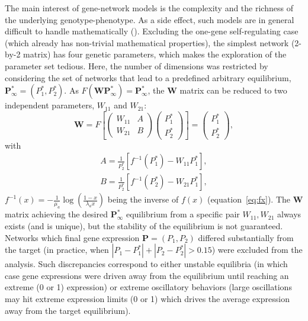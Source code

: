 \documentclass[10pt,a4paper]{article}
\begin{document}
The main interest of gene-network models is the complexity and the richness of the underlying genotype-phenotype. As a side effect, such models are in general difficult to handle mathematically (\cite{CTH11,LP12}). Excluding the one-gene self-regulating case (which already has non-trivial mathematical properties), the simplest network (2-by-2 matrix) has four genetic parameters, which makes the exploration of the parameter set tedious. Here, the number of dimensions was restricted by considering the set of networks that lead to a predefined arbitrary equilibrium, $\bm P^\ast_\infty = (P^\ast_1, P^\ast_2)$. As $F(\bm W \bm P^\ast_\infty) = \bm P^\ast_\infty$, the $\bm W$ matrix can be reduced to two independent parameters, $W_{11}$ and $W_{21}$:
\begin{equation}
    \bm W = F \left [\begin{pmatrix} W_{11} & A \\ W_{21} & B \end{pmatrix}  \begin{pmatrix} P^\ast_1 \\ P^\ast_2 \end{pmatrix} \right] = \begin{pmatrix}P^\ast_1 \\ P^\ast_2 \end{pmatrix},
\end{equation}
\noindent with
\begin{equation}
	\label{eq:predef}
    \begin{split}
        A = \frac{1}{P^\ast_2} [f^{-1}(P^\ast_1)-W_{11}P^\ast_1], \\
        B = \frac{1}{P^\ast_2} [f^{-1}(P^\ast_2) - W_{21} P^\ast_1],
    \end{split}
\end{equation}
\noindent $f^{-1}(x) = -\frac{1}{\mu_a} \log \left( \frac{1-x}{\lambda_a x} \right)$ being the inverse of $f(x)$ (equation~\ref{eq:fx}). The $\bm W$ matrix achieving the desired $\bm P^\ast_\infty$ equilibrium from a specific pair $W_{11}, W_{21}$ always exists (and is unique), but the stability of the equilibrium is not guaranteed. Networks which final gene expression $\bm P = (P_1,P_2)$ differed substantially from the target (in practice, when $|P_1 - P^\ast_1| + |P_2 - P^\ast_2| > 0.15$) were excluded from the analysis. Such discrepancies correspond to either unstable equilibria (in which case gene expressions were driven away from the equilibrium until reaching an extreme (0 or 1) expression) or extreme oscillatory behaviors (large oscillations may hit extreme expression limits (0 or 1) which drives the average expression away from the target equilibrium). 
\end{document}
